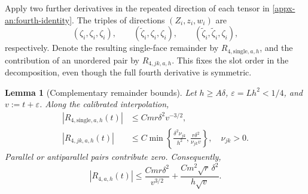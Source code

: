 \documentclass[11pt,letterpaper]{article}
\newtheorem{lemma}{Lemma}
\theoremstyle{remark}
\begin{document}
Apply two further derivatives in the repeated direction of each
tensor in \eqref{appx-an:fourth-identity}. The triples of directions
\((Z_i,z_i,w_i)\) are
\[
 (\zeta_i,\zeta_i,\zeta_i),\qquad
 (\widetilde\zeta_i,\zeta_i,\zeta_i),\qquad
 (\widetilde\zeta_i,\widetilde\zeta_i,\zeta_i),
\]
respectively. Denote the resulting single-face remainder by
\(R_{4,\mathrm{single},a,h}\), and the contribution of an unordered
pair by \(R_{4,jk,a,h}\). This fixes the slot order in the
decomposition, even though the full fourth derivative is symmetric.

\begin{lemma}[Complementary remainder bounds]
\label{lem:cap-remainder}
Let \(h\ge A\delta\), \(\varepsilon=Lh^2<1/4\), and
\(v:=t+\varepsilon\). Along the calibrated interpolation,
\begin{align}
 |R_{4,\mathrm{single},a,h}(t)|
 &\le Cmr\delta^2v^{-3/2},
 \label{cap:single}\\
 |R_{4,jk,a,h}(t)|
 &\le C\min\left\{\frac{\delta^2\nu_{jk}}{h^2},
                    \frac{r\delta^2}{\nu_{jk}v}\right\},
 \quad \nu_{jk}>0.
 \label{cap:pair}
\end{align}
Parallel or antiparallel pairs contribute zero. Consequently,
\begin{equation}
 |R_{4,a,h}(t)|
 \le \frac{Cmr\delta^2}{v^{3/2}}
       +\frac{Cm^2\sqrt r\,\delta^2}{h\sqrt v}.
 \label{cap:complementary}
\end{equation}
\end{lemma}
\end{document}
